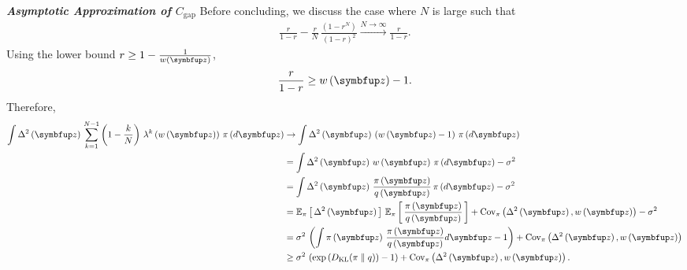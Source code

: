 \begin{proofEnd}
\textit{\textbf{Asymptotic Approximation of \(C_{\text{gap}}\)}}\quad
Before concluding, we discuss the case where \(N\) is large such that
\begin{align*}
 \frac{r}{1-r} -
 \frac{r}{N}\,\frac{\left(1-r^N\right)}{{\left(1-r\right)}^2}
 \xrightarrow{N \rightarrow \infty}
 \frac{r}{1-r}.
\end{align*}
Using the lower bound \(r \geq 1 - \frac{1}{w\left(\vz\right)}\),
\begin{align*}
  \frac{r}{1-r} \geq w\left(\vz\right) - 1.
\end{align*}
Therefore,
\begin{align*}
  \int
  \Delta^2\left(\vz\right) \,
  \sum_{k=1}^{N-1} 
  \left(1 - \frac{k}{N}\right) \, \lambda^k\left(w\left(\vz\right)\right)
  \, \pi\left(d\vz\right)
  &\rightarrow
  \int
  \Delta^2\left(\vz\right) \,
  \left(
  w\left(\vz\right)
  -
  1
  \right)
  \, \pi\left(d\vz\right)
  \\
  &=
  \int
  \Delta^2\left(\vz\right) \,
  w\left(\vz\right)
  \, \pi\left(d\vz\right)
  - \sigma^2
  \\
  &=
  \int
  \Delta^2\left(\vz\right) \,
  \frac{\pi\left(\vz\right)}{q\left(\vz\right)}
  \, \pi\left(d\vz\right)
  - \sigma^2
  \\
  &=
  \Esub{\pi}{\Delta^2\left(\vz\right)} \, \Esub{\pi}{\frac{\pi\left(\vz\right)}{q\left(\vz\right)}}
  +
  \text{Cov}_{\pi}\left(\Delta^2\left(\vz\right), w\left(\vz\right) \right)
  - \sigma^2
  \\
  &=
  \sigma^2 \, \left(\int \pi\left(\vz\right)\,\frac{\pi\left(\vz\right)}{q\left(\vz\right)} d\vz  - 1\right)
  +
  \text{Cov}_{\pi}\left(\Delta^2\left(\vz\right), w\left(\vz\right) \right)
  \\
  &\geq
  \sigma^2 \, \left( \exp\left(\DKL{\pi}{q}\right) - 1\right)
  +
  \text{Cov}_{\pi}\left(\Delta^2\left(\vz\right), w\left(\vz\right) \right).
\end{align*}
\end{proofEnd}

